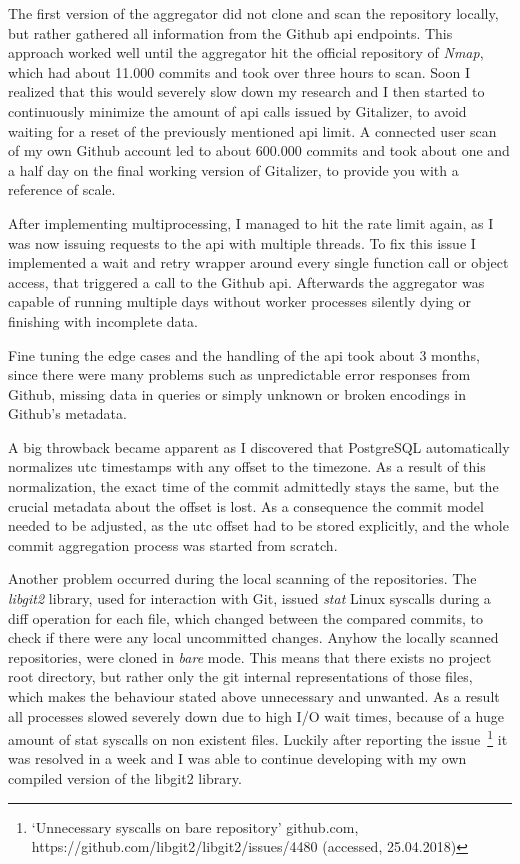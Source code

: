 The first version of the aggregator did not clone and scan the repository locally, but rather gathered all information from the Github \ac{api} endpoints.
This approach worked well until the aggregator hit the official repository of \emph{Nmap}, which had about 11.000 commits and took over three hours to scan.
Soon I realized that this would severely slow down my research and I then started to continuously minimize the amount of \ac{api} calls issued by Gitalizer, to avoid waiting for a reset of the previously mentioned \ac{api} limit.
A connected user scan of my own Github account led to about 600.000 commits and took about one and a half day on the final working version of Gitalizer, to provide you with a reference of scale.

After implementing multiprocessing, I managed to hit the rate limit again, as I was now issuing requests to the \ac{api} with multiple threads.
To fix this issue I implemented a wait and retry wrapper around every single function call or object access, that triggered a call to the Github \ac{api}.
Afterwards the aggregator was capable of running multiple days without worker processes silently dying or finishing with incomplete data.

Fine tuning the edge cases and the handling of the \ac{api} took about 3 months, since there were many problems such as unpredictable error responses from Github, missing data in queries or simply unknown or broken encodings in Github's metadata.

A big throwback became apparent as I discovered that PostgreSQL automatically normalizes \ac{utc} timestamps with any offset to the  timezone.
As a result of this normalization, the exact time of the commit admittedly stays the same, but the crucial metadata about the offset is lost.
As a consequence the commit model needed to be adjusted, as the \ac{utc} offset had to be stored explicitly, and the whole commit aggregation process was started from scratch.

Another problem occurred during the local scanning of the repositories.
The \emph{libgit2} library, used for interaction with Git, issued \emph{stat} Linux syscalls during a diff operation for each file, which changed between the compared commits, to check if there were any local uncommitted changes.
Anyhow the locally scanned repositories, were cloned in \emph{bare} mode.
This means that there exists no project root directory, but rather only the git internal representations of those files, which makes the behaviour stated above unnecessary and unwanted.
As a result all processes slowed severely down due to high I/O wait times, because of a huge amount of stat syscalls on non existent files.
Luckily after reporting the issue~\footnote{`Unnecessary syscalls on bare repository' github.com, https://github.com/libgit2/libgit2/issues/4480 (accessed, 25.04.2018)} it was resolved in a week and I was able to continue developing with my own compiled version of the libgit2 library.
